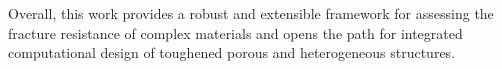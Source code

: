 \documentclass[pdflatex,sn-mathphys-num]{sn-jnl}%
\theoremstyle{thmstyleone}%
\theoremstyle{thmstyletwo}%
\theoremstyle{thmstylethree}%
\begin{document}
Overall, this work provides a robust and extensible framework for assessing the fracture resistance
of complex materials and opens the path for integrated computational design of toughened porous and
heterogeneous structures.












\end{document}
